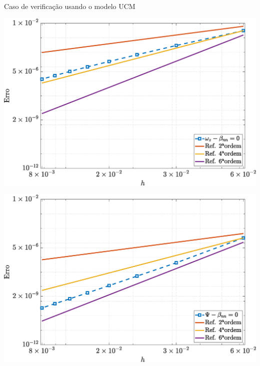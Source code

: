 \begin{frame}{Caso de verificação usando o modelo UCM}
    \centering
    \captionsetup{justification=centering}
    \label{fig:ucm_2}
    \begin{minipage}{0.49\textwidth}
        \centering
        \includegraphics[width=\textwidth]{Figures/UCM/NormErr_2nd_Re_100_Wi_1_epsilon_0_xi_0_alphaG_0_Dt_1e-06_at_0.05_tipsim_1_MMS_12_Wz.eps}
        \label{ucm_wz_Case11}
    \end{minipage}
    \hfill
    \begin{minipage}{0.49\textwidth}
        \centering
        \includegraphics[width=\textwidth]{Figures/UCM/NormErr_2nd_Re_100_Wi_1_epsilon_0_xi_0_alphaG_0_Dt_1e-06_at_0.05_tipsim_1_MMS_12_Psi.eps}
        \label{ucm_psi_Case11}
    \end{minipage}
\end{frame}

